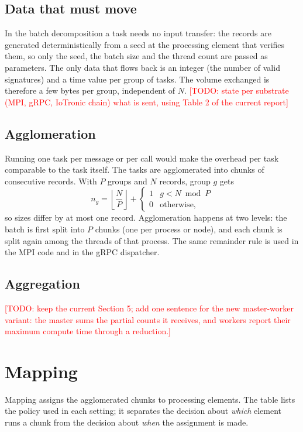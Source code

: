 \documentclass[11pt,a4paper]{article}
\newcommand{\todo}[1]{\textcolor{red}{[TODO: #1]}}
\begin{document}
\subsection{Data that must move}

In the batch decomposition a task needs no input transfer: the records are generated deterministically from a seed at the processing element that verifies them, so only the seed, the batch size and the thread count are passed as parameters. The only data that flows back is an integer (the number of valid signatures) and a time value per group of tasks. The volume exchanged is therefore a few bytes per group, independent of $N$. \todo{state per substrate (MPI, gRPC, IoTronic chain) what is sent, using Table 2 of the current report}

\subsection{Agglomeration}

Running one task per message or per call would make the overhead per task comparable to the task itself. The tasks are agglomerated into chunks of consecutive records. With $P$ groups and $N$ records, group $g$ gets
\[
n_g = \left\lfloor \frac{N}{P} \right\rfloor + \begin{cases}1 & g < N \bmod P\\0 & \text{otherwise,}\end{cases}
\]
so sizes differ by at most one record. Agglomeration happens at two levels: the batch is first split into $P$ chunks (one per process or node), and each chunk is split again among the threads of that process. The same remainder rule is used in the MPI code and in the gRPC dispatcher.

\subsection{Aggregation}
\todo{keep the current Section 5; add one sentence for the new master-worker variant: the master sums the partial counts it receives, and workers report their maximum compute time through a reduction.}

\section{Mapping}\label{sec:mapping}

Mapping assigns the agglomerated chunks to processing elements. The table lists the policy used in each setting; it separates the decision about \emph{which} element runs a chunk from the decision about \emph{when} the assignment is made.
\end{document}
